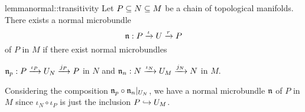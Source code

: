 \begin{mystatement}{lemma}{normal::transitivity}
    Let $P \sub N \sub M$ be a chain of topological manifolds.
    There exists a normal microbundle
    \[ \bundledef{\bn}{P}{U}{\iota}{r} \]
    of $P$ in $M$ if there exist normal microbundles
    \begin{center}
        $\bundledef{\bn_p}{P}{U_N}{\iota_P}{j_P}$ in $N$ and $\bundledef{\bn_n}{N}{U_M}{\iota_N}{j_N}$ in $M$.
    \end{center}
\end{mystatement}

\begin{myproof}
    Considering the composition $\bn_p \circ \bn_n\restr{U_N}$,
    we have a normal microbundle $\bn$ of $P$ in $M$
    since $\iota_N \circ \iota_P$ is just the inclusion $P \incl U_M$.
\end{myproof}